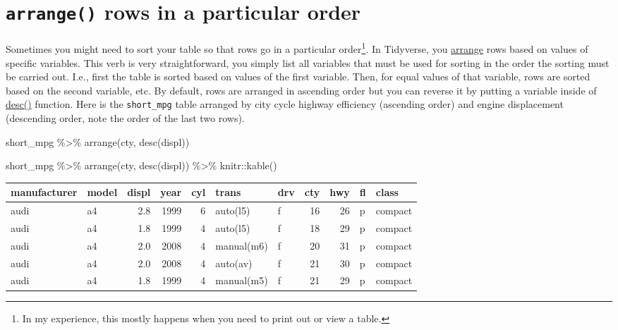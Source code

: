 \documentclass[
]{book}
\newenvironment{Shaded}{\begin{snugshade}}{\end{snugshade}}
\newcommand{\FunctionTok}[1]{\textcolor[rgb]{0.00,0.00,0.00}{#1}}
\newcommand{\NormalTok}[1]{#1}
\newcommand{\SpecialCharTok}[1]{\textcolor[rgb]{0.00,0.00,0.00}{#1}}
\begin{document}
\hypertarget{arrange-rows-in-a-particular-order}{%
\section{\texorpdfstring{\texttt{arrange()} rows in a particular order}{arrange() rows in a particular order}}\label{arrange-rows-in-a-particular-order}}

Sometimes you might need to sort your table so that rows go in a particular order\footnote{In my experience, this mostly happens when you need to print out or view a table.}. In Tidyverse, you \href{https://dplyr.tidyverse.org/reference/arrange.html}{arrange} rows based on values of specific variables. This verb is very straightforward, you simply list all variables that must be used for sorting in the order the sorting must be carried out. I.e., first the table is sorted based on values of the first variable. Then, for equal values of that variable, rows are sorted based on the second variable, etc. By default, rows are arranged in ascending order but you can reverse it by putting a variable inside of \href{https://dplyr.tidyverse.org/reference/desc.html}{desc()} function. Here is the \texttt{short\_mpg} table arranged by city cycle highway efficiency (ascending order) and engine displacement (descending order, note the order of the last two rows).

\begin{Shaded}
\begin{Highlighting}[]
\NormalTok{short\_mpg }\SpecialCharTok{\%\textgreater{}\%}
  \FunctionTok{arrange}\NormalTok{(cty, }\FunctionTok{desc}\NormalTok{(displ)) }
\end{Highlighting}
\end{Shaded}

\begin{Shaded}
\begin{Highlighting}[]
\NormalTok{short\_mpg }\SpecialCharTok{\%\textgreater{}\%}
  \FunctionTok{arrange}\NormalTok{(cty, }\FunctionTok{desc}\NormalTok{(displ)) }\SpecialCharTok{\%\textgreater{}\%}
\NormalTok{  knitr}\SpecialCharTok{::}\FunctionTok{kable}\NormalTok{()}
\end{Highlighting}
\end{Shaded}

\begin{tabular}{l|l|r|r|r|l|l|r|r|l|l}
\hline
manufacturer & model & displ & year & cyl & trans & drv & cty & hwy & fl & class\\
\hline
audi & a4 & 2.8 & 1999 & 6 & auto(l5) & f & 16 & 26 & p & compact\\
\hline
audi & a4 & 1.8 & 1999 & 4 & auto(l5) & f & 18 & 29 & p & compact\\
\hline
audi & a4 & 2.0 & 2008 & 4 & manual(m6) & f & 20 & 31 & p & compact\\
\hline
audi & a4 & 2.0 & 2008 & 4 & auto(av) & f & 21 & 30 & p & compact\\
\hline
audi & a4 & 1.8 & 1999 & 4 & manual(m5) & f & 21 & 29 & p & compact\\
\hline
\end{tabular}
\end{document}
